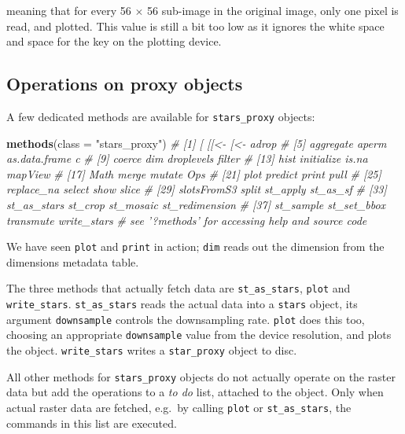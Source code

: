 \documentclass[]{book}
\newenvironment{Shaded}{\begin{snugshade}}{\end{snugshade}}
\newcommand{\CommentTok}[1]{\textcolor[rgb]{0.56,0.35,0.01}{\textit{#1}}}
\newcommand{\DataTypeTok}[1]{\textcolor[rgb]{0.13,0.29,0.53}{#1}}
\newcommand{\KeywordTok}[1]{\textcolor[rgb]{0.13,0.29,0.53}{\textbf{#1}}}
\newcommand{\NormalTok}[1]{#1}
\newcommand{\StringTok}[1]{\textcolor[rgb]{0.31,0.60,0.02}{#1}}
\begin{document}
meaning that for every 56 \(\times\) 56 sub-image in the
original image, only one pixel is read, and plotted. This value is
still a bit too low as it ignores the white space and space for
the key on the plotting device.

\hypertarget{operations-on-proxy-objects}{%
\subsection{Operations on proxy objects}\label{operations-on-proxy-objects}}

A few dedicated methods are available for \texttt{stars\_proxy} objects:

\begin{Shaded}
\begin{Highlighting}[]
\KeywordTok{methods}\NormalTok{(}\DataTypeTok{class =} \StringTok{"stars_proxy"}\NormalTok{)}
\CommentTok{#  [1] [              [[<-           [<-            adrop         }
\CommentTok{#  [5] aggregate      aperm          as.data.frame  c             }
\CommentTok{#  [9] coerce         dim            droplevels     filter        }
\CommentTok{# [13] hist           initialize     is.na          mapView       }
\CommentTok{# [17] Math           merge          mutate         Ops           }
\CommentTok{# [21] plot           predict        print          pull          }
\CommentTok{# [25] replace_na     select         show           slice         }
\CommentTok{# [29] slotsFromS3    split          st_apply       st_as_sf      }
\CommentTok{# [33] st_as_stars    st_crop        st_mosaic      st_redimension}
\CommentTok{# [37] st_sample      st_set_bbox    transmute      write_stars   }
\CommentTok{# see '?methods' for accessing help and source code}
\end{Highlighting}
\end{Shaded}

We have seen \texttt{plot} and \texttt{print} in action; \texttt{dim} reads out
the dimension from the dimensions metadata table.

The three methods that actually fetch data are \texttt{st\_as\_stars},
\texttt{plot} and \texttt{write\_stars}. \texttt{st\_as\_stars} reads the actual data into a
\texttt{stars} object, its argument \texttt{downsample} controls the downsampling
rate. \texttt{plot} does this too, choosing an appropriate \texttt{downsample}
value from the device resolution, and plots the object. \texttt{write\_stars}
writes a \texttt{star\_proxy} object to disc.

All other methods for \texttt{stars\_proxy} objects do not actually operate
on the raster data but add the operations to a \emph{to do} list,
attached to the object. Only when actual raster data are fetched,
e.g.~by calling \texttt{plot} or \texttt{st\_as\_stars}, the commands in this list
are executed.
\end{document}
